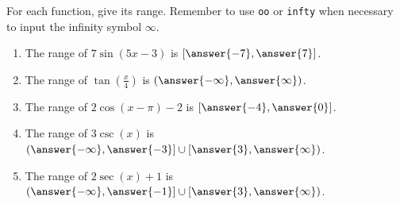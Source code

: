 \documentclass{ximera}
\author{Kenneth Berglund}
\begin{document}
\begin{exercise}
For each function, give its range. Remember to use \verb+oo+ or \verb+infty+ when necessary to input the infinity symbol $\infty$. 

\begin{enumerate}
\item The range of $7\sin(5x - 3)$ is $[\answer{-7},\answer{7}]$.

\item The range of $\tan\left(\frac{x}{4}\right)$ is $(\answer{-\infty},\answer{\infty})$.

\item The range of $2\cos(x - \pi) - 2$ is $[\answer{-4},\answer{0}]$.

\item The range of $3\csc(x)$ is $(\answer{-\infty}, \answer{-3}] \cup [\answer{3}, \answer{\infty})$.

\item The range of $2\sec(x) + 1$ is $(\answer{-\infty}, \answer{-1}] \cup [\answer{3}, \answer{\infty})$.

\end{enumerate}


\end{exercise}
\end{document}
